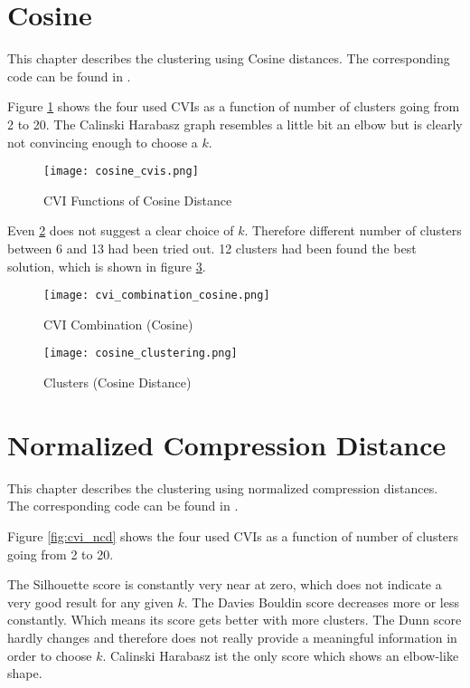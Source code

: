 
\clearpage
\section{Cosine}


This chapter describes the clustering using Cosine distances. The corresponding code can be found in .


Figure \ref{fig:cvi_cosine} shows the four used CVIs as a function of number of clusters going from 2 to 20. The Calinski Harabasz graph resembles a little bit an elbow but is clearly not convincing enough to choose a $k$.


\begin{figure}[h!]
	\texttt{[image: cosine\_cvis.png]}
	\caption{CVI Functions of Cosine Distance}
	\label{fig:cvi_cosine}
\end{figure}


\clearpage
Even \ref{fig:cvi_cosine_combo} does not suggest a clear choice of $k$. Therefore different number of clusters between 6 and 13 had been tried out. 12 clusters had been found the best solution, which is shown in figure \ref{fig:cosine_clusters}.

\begin{figure}[h!]
	\texttt{[image: cvi\_combination\_cosine.png]}
	\caption{CVI Combination (Cosine)}
	\label{fig:cvi_cosine_combo}
\end{figure}

\clearpage
\begin{figure}[h!]
	\texttt{[image: cosine\_clustering.png]}
	\caption{Clusters (Cosine Distance)}
	\label{fig:cosine_clusters}
\end{figure}



\clearpage
\section{Normalized Compression Distance}


This chapter describes the clustering using normalized compression distances. The corresponding code can be found in .

Figure \ref{fig:cvi_ncd} shows the four used CVIs as a function of number of clusters going from 2 to 20. 

The Silhouette score is constantly very near at zero, which does not indicate a very good result for any given $k$. The Davies Bouldin score decreases more or less constantly. Which means its score gets better with more clusters. The Dunn score hardly changes and therefore does not really provide a meaningful information in order to choose $k$. Calinski Harabasz ist the only score which shows an elbow-like shape. 


